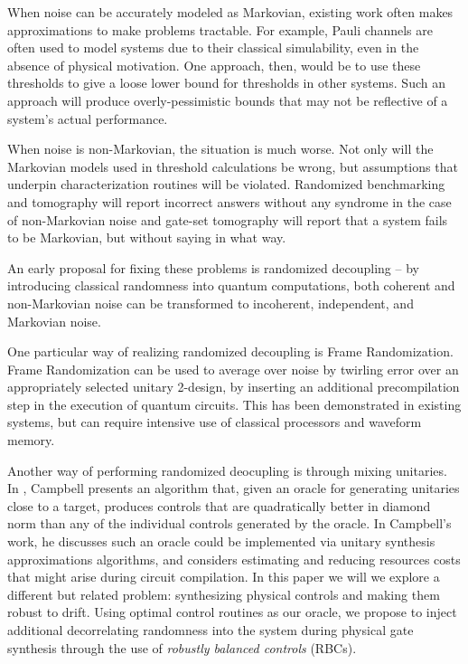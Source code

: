 \documentclass[aps,nofootinbib,pra,notitlepage,twocolumn]{revtex4-1}
\begin{document}
When noise can be accurately modeled as Markovian, existing work often makes approximations to make problems tractable. For example, Pauli channels are often used to model systems due to their classical simulability\cite{quant-ph/9807006}, even in the absence of physical motivation\cite{Aliferis2007, Knill2005, Wang2011, DuclosCianci2010, Wootton2012, Bombin2012, Puzzuoli2014, aliferis2008accuracy}. One approach, then, would be to use these thresholds to give a loose lower bound for thresholds in other systems\cite{Puzzuoli2014}. Such an approach will produce overly-pessimistic bounds that may not be reflective of a system's actual performance.

When noise is non-Markovian, the situation is much worse. Not only will the Markovian models used in threshold calculations be wrong, but assumptions that underpin characterization routines will be violated. Randomized benchmarking and tomography will report incorrect answers without any syndrome in the case of non-Markovian noise \cite{Merkel2013} and gate-set tomography will report that a system fails to be Markovian, but without saying in what way.

An early proposal for fixing these problems is randomized decoupling\cite{Viola2005, Viola} -- by introducing classical randomness into quantum computations, both coherent and non-Markovian noise can be transformed to incoherent, independent, and Markovian noise.

One particular way of realizing randomized decoupling is Frame Randomization\cite{Wallman2016, Ware2018}. Frame Randomization can be used to average over noise by twirling error over an appropriately selected unitary 2-design, by inserting an additional precompilation step in the execution of quantum circuits.\cite{roy2009unitary} This has been demonstrated in existing systems\cite{Ware2018}, but can require intensive use of classical processors and waveform memory.

Another way of performing randomized deocupling is through mixing unitaries. In \cite{Campbell2017}, Campbell presents an algorithm that, given an oracle for generating unitaries close to a target, produces controls that are quadratically better in diamond norm than any of the individual controls generated by the oracle. In Campbell's work, he discusses such an oracle could be implemented via unitary synthesis approximations algorithms\cite{1612.01011}, and considers estimating and reducing resources costs that might arise during circuit compilation. In this paper we will we explore a different but related problem: synthesizing physical controls and making them robust to drift. Using optimal control routines as our oracle, we propose to inject additional decorrelating randomness into the system during physical gate synthesis through the use of \emph{robustly balanced controls} (RBCs).
 
\end{document}
